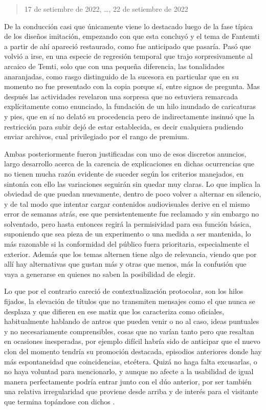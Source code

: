 \documentclass[
]{book}
\begin{document}
\begin{quote}
17 de setiembre de 2022, \ldots, 22 de setiembre de 2022
\end{quote}

De la conducción casi que únicamente viene lo destacado luego de la fase típica de los diseños imitación, empezando con que esta concluyó y el tema de Fantemti a partir de ahí apareció restaurado, como fue anticipado que pasaría. Pasó que volvió a irse, en una especie de regresión temporal que trajo sorpresivamente al arcaico de Temti, solo que con una pequeña diferencia, las tonalidades anaranjadas, como rasgo distinguido de la sucesora en particular que en su momento no fue presentado con la copia porque sí, entre signos de pregunta. Mas después las actividades revelaron una sorpresa que no estuviera remarcada explícitamente como enunciado, la fundación de un hilo inundado de caricaturas y pies, que en sí no delató su procedencia pero de indirectamente insinuó que la restricción para subir dejó de estar establecida, es decir cualquiera pudiendo enviar archivos, cual privilegiado por el rango de premium.

Ambas posteriormente fueron justificadas con uno de esos discretos anuncios, largo desarrollo acerca de la carencia de explicaciones en dichas ocurrencias que no tienen mucha razón evidente de suceder según los criterios manejados, en sintonía con ello las variaciones seguirán sin quedar muy claras. Lo que implica la obviedad de que puedan nuevamente, dentro de poco volver a alternar en silencio, y de tal modo que intentar cargar contenidos audiovisuales derive en el mismo error de semanas atrás, ese que persistentemente fue reclamado y sin embargo no solventado, pero hasta entonces regirá la permisividad para esa función básica, suponiendo que sea pieza de un experimento o una medida a ser mantenida, lo más razonable si la conformidad del público fuera prioritaria, especialmente el exterior. Además que los temas alternen tiene algo de relevancia, viendo que por allí hay alternativas que gustan más y otras que menos, más la confusión que vaya a generarse en quienes no saben la posibilidad de elegir.

Lo que por el contrario careció de contextualización protocolar, son los hilos fijados, la elevación de títulos que no transmiten mensajes como el que nunca se desplaza y que difieren en ese matiz que los caracteriza como oficiales, habitualmente hablando de antros que pueden venir o no al caso, ideas puntuales y no necesariamente comprensibles, cosas que no varían tanto pero que resaltan en ocasiones inesperadas, por ejemplo difícil habría sido de anticipar que el nuevo clon del momento tendría su promoción destacada, episodios anteriores donde hay más espontaneidad que coincidencias, etcétera. Quizá no haga falta excusarlas, o no haya voluntad para mencionarlo, y aunque no afecte a la usabilidad de igual manera perfectamente podría entrar junto con el dúo anterior, por ser también una relativa irregularidad que proviene desde arriba y de interés para el visitante que termina topándose con dichos .
\end{document}
